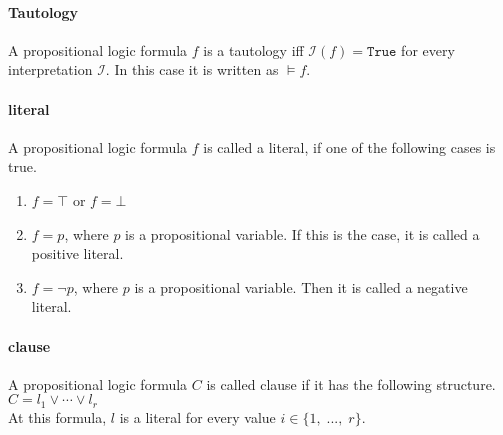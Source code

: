 \paragraph{Tautology}
A propositional logic formula $f$ is a tautology iff $\mathcal{I}(f) = \texttt{True}$ for every interpretation $\mathcal{I}$. In this case it is written as $\models f$.

\paragraph{literal}
A propositional logic formula $f$ is called a literal, if one of the following cases is true.

\begin{enumerate}
  \item $f = \top$ or $f = \bot$
  \item $f = p$, where $p$ is a propositional variable. If this is the case, it is called a positive literal.
  \item $f = \neg p$, where $p$ is a propositional variable. Then it is called a negative literal.
\end{enumerate}

\paragraph{clause}
A propositional logic formula $C$ is called clause if it has the following structure.
\\[0.2cm]
\hspace*{1.3cm} $C = l_1 \vee \cdots \vee l_r$ \\[0.2cm] At this formula, $l$ is a literal for every value $i \in \{1,\; ...,\; r\}$.

